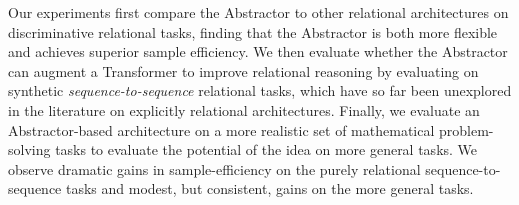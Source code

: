 Our experiments first compare the Abstractor to other relational architectures on discriminative relational tasks, finding that the Abstractor is both more flexible and achieves superior sample efficiency. We then evaluate whether the Abstractor can augment a Transformer to improve relational reasoning by evaluating on synthetic \textit{sequence-to-sequence} relational tasks, which have so far been unexplored in the literature on explicitly relational architectures. Finally, we evaluate an Abstractor-based architecture on a more realistic set of mathematical problem-solving tasks to evaluate the potential of the idea on more general tasks. We observe dramatic gains in sample-efficiency on the purely relational sequence-to-sequence tasks and modest, but consistent, gains on the more general tasks.

